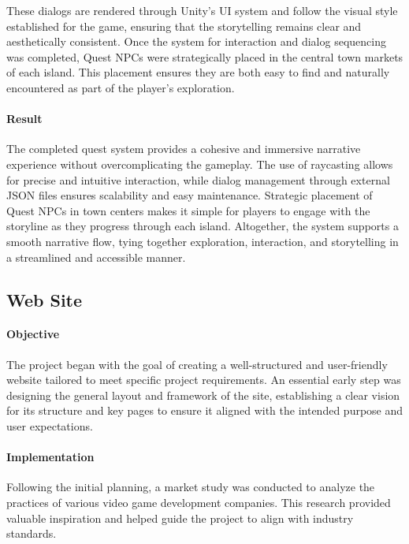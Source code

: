 \documentclass{article}
\begin{document}
These dialogs are rendered through Unity's UI system and follow the visual style established for the game, ensuring that the storytelling remains clear and aesthetically consistent. Once the system for interaction and dialog sequencing was completed, Quest NPCs were strategically placed in the central town markets of each island. This placement ensures they are both easy to find and naturally encountered as part of the player's exploration.

\paragraph{Result}\hfill

The completed quest system provides a cohesive and immersive narrative experience without overcomplicating the gameplay. The use of raycasting allows for precise and intuitive interaction, while dialog management through external JSON files ensures scalability and easy maintenance. Strategic placement of Quest NPCs in town centers makes it simple for players to engage with the storyline as they progress through each island. Altogether, the system supports a smooth narrative flow, tying together exploration, interaction, and storytelling in a streamlined and accessible manner.









\newpage
\subsection{Web Site}
\paragraph{Objective}\hfill

The project began with the goal of creating a well-structured and user-friendly website tailored to meet specific project requirements. An essential early step was designing the general layout and framework of the site, establishing a clear vision for its structure and key pages to ensure it aligned with the intended purpose and user expectations.

\paragraph{Implementation}\hfill

Following the initial planning, a market study was conducted to analyze the practices of various video game development companies. This research provided valuable inspiration and helped guide the project to align with industry standards.\\
\end{document}

